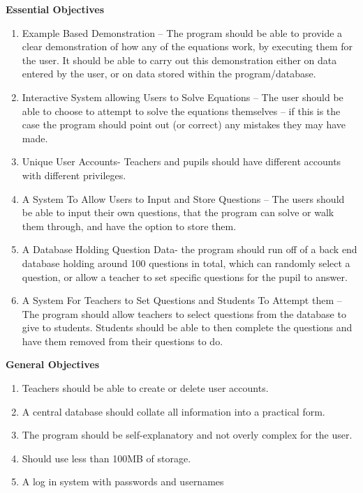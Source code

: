 \documentclass[a4paper,12pt]{report}
\begin{document}
\textbf{Essential Objectives}\\
\begin{enumerate}
\item Example Based Demonstration – The program should be able to provide a clear demonstration of how any of the equations work, by executing them for the user. It should be able to carry out this demonstration either on data entered by the user, or on data stored within the program/database.
\item Interactive System allowing Users to Solve Equations – The user should be able to choose to attempt to solve the equations themselves – if this is the case the program should point out (or correct) any mistakes they may have made.
\item Unique User Accounts- Teachers and pupils should have different accounts with different privileges.
\item A System To Allow Users to Input and Store Questions – The users should be able to input their own questions, that the program can solve or walk them through, and have the option to store them.
\item A Database Holding Question Data- the program should run off of a back end database holding around 100 questions in total, which can randomly select a question, or allow a teacher to set specific questions for the pupil to answer.
\item A System For Teachers to Set Questions and Students To Attempt them – The program should allow teachers to select questions from the database to give to students. Students should be able to then complete the questions and have them removed from their questions to do.

\end{enumerate}

\textbf{General Objectives}
\begin{enumerate}
\item Teachers should be able to create or delete user accounts.
\item  A central database should collate all information into a practical form.
\item The program should be self-explanatory and not overly complex for the user.
\item Should use less than 100MB of storage.
\item A log in system with passwords and usernames
\end{enumerate}
\end{document}
